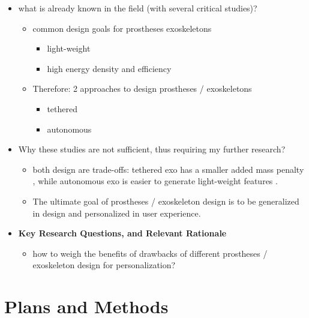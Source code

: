 \documentclass[8pt]{article}
\begin{document}
\begin{itemize}
    \item what is already known in the field (with several critical studies)?
    
    \begin{itemize}
        \item common design goals for prostheses exoskeletons
        \begin{itemize}
            \item light-weight \cite{ProsthesisOverview}
            \item high energy density and efficiency \cite{OSLSpring}
        \end{itemize}
        \item Therefore: 2 approaches to design prostheses / exoskeletons
        \begin{itemize}
            \item tethered \cite{tetheredExoEg}
            \item autonomous \cite{OSL2020}
        \end{itemize}
    \end{itemize}
    
    \item Why these studies are not sufficient, thus requiring my further research?
    
    \begin{itemize}
        \item both design are trade-offs: tethered exo has a smaller added mass penalty \cite{tetheredExoBenefits}, while autonomous exo is easier to generate light-weight features \cite{OSLSpring}. 
        \item The ultimate goal of prostheses / exoskeleton design is to be generalized in design and personalized in user experience. 
    \end{itemize}
    
    \item \textbf{Key Research Questions, and Relevant Rationale}
    
    \begin{itemize}
        \item how to weigh the benefits of drawbacks of different prostheses / exoskeleton design for personalization? 
    \end{itemize}
    

\end{itemize}

\section{Plans and Methods}
\end{document}
